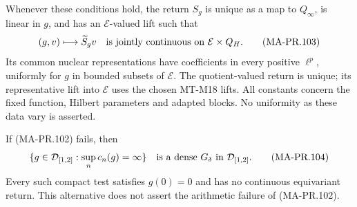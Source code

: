 Whenever these conditions hold, the return \(S_g\) is
unique as a map to \(Q_\infty\), is linear in \(g\),
and has an \(\mathcal E\)-valued lift such that
\[
       (g,v)\longmapsto\widetilde S_gv
             \quad\hbox{is jointly continuous on }
                         \mathcal E\times Q_H .
 \tag{MA-PR.103}
\]
Its common nuclear representations have coefficients
in every positive \(\ell^p\), uniformly for \(g\)
in bounded subsets of \(\mathcal E\).
The quotient-valued return is unique; its representative
lift into \(\mathcal E\) uses the chosen MT-M18 lifts.
All constants concern the fixed function, Hilbert
parameters and adapted blocks.  No uniformity as these
data vary is asserted.

If (MA-PR.102) fails, then
\[
 \{g\in\mathcal D_{[1,2]}:
                   \sup_n c_n(g)=\infty\}
       \quad\hbox{is a dense }G_\delta
                    \hbox{ in }\mathcal D_{[1,2]}.
 \tag{MA-PR.104}
\]
Every such compact test satisfies \(g(0)=0\) and
has no continuous equivariant return.  This alternative
does not assert the arithmetic failure of (MA-PR.102).

